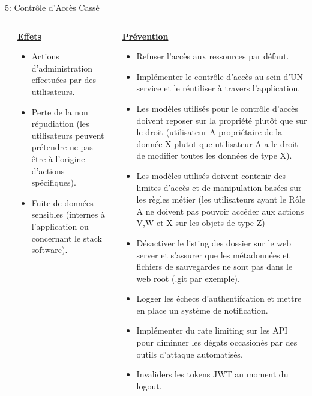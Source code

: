 \documentclass[final,hyperref={pdfpagelabels=false}]{beamer}
\begin{document}
\begin{frame}[t]
\begin{columns}[t]
\begin{column}{.465\textwidth}
\begin{block}{5: Contrôle d'Accès Cassé}
	\begin{columns}[T]
		\begin{column}{.01\textwidth}
		\end{column}
		\begin{column}{0.495\textwidth}
			\vfill
			\uline{\textbf{Effets}}
			\begin{itemize}
				\item Actions d'administration effectuées par des utilisateurs.
				\item Perte de la non répudiation (les utilisateurs peuvent prétendre ne pas être à l'origine d'actions spécifiques).
				\item Fuite de données sensibles (internes à l'application ou concernant le stack software).
			\end{itemize}
			\vfill
		\end{column}
		\begin{column}{0.495\textwidth}
			\vfill
			\uline{\textbf{Prévention}}
			\begin{itemize}
				\item Refuser l'accès aux ressources par défaut.
				\item Implémenter le contrôle d'accès au sein d'UN service et le réutiliser à travers l'application.
				\item Les modèles utilisés pour le contrôle d'accès doivent reposer sur la propriété plutôt que sur le droit (utilisateur A propriétaire de la donnée X plutot que utilisateur A a le droit de modifier toutes les données de type X).
				\item Les modèles utilisés doivent contenir des limites d'accès et de manipulation basées sur les règles métier (les utilisateurs ayant le Rôle A ne doivent pas pouvoir accéder aux actions V,W et X sur les objets de type Z)
				\item Désactiver le listing des dossier sur le web server et s'assurer que les métadonnées et fichiers de sauvegardes ne sont pas dans le web root (.git par exemple).
				\item Logger les échecs d'authentifcation et mettre en place un système de notification.
				\item Implémenter du rate limiting sur les API pour diminuer les dégats occasionés par des outils d'attaque automatisés.
				\item Invaliders les tokens JWT au moment du logout.
			\end{itemize}
		\end{column}
	\end{columns}
\end{block}


\end{column}
\end{columns}
\end{frame}
\end{document}
